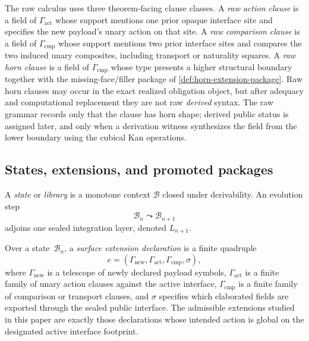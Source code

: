 \documentclass{lmcs}
\newcommand{\B}{\mathcal{B}}
\begin{document}
\begin{defi}
\label{def:raw-structural-clauses}
The raw calculus uses three theorem-facing clause classes. A \emph{raw action
clause} is a field of $\Gamma_{\mathrm{act}}$ whose support mentions one prior
opaque interface site and specifies the new payload's unary action on that site.
A \emph{raw comparison clause} is a field of $\Gamma_{\mathrm{cmp}}$ whose
support mentions two prior interface sites and compares the two induced unary
composites, including transport or naturality squares. A \emph{raw horn clause}
is a field of $\Gamma_{\mathrm{cmp}}$ whose type presents a higher structural
boundary together with the missing-face/filler package of
\autoref{def:horn-extension-package}. Raw horn clauses may occur in the exact
realized obligation object, but after adequacy and computational replacement
they are not raw \emph{derived} syntax. The raw grammar records only that the
clause has horn shape; derived public status is assigned later, and only when a
derivation witness synthesizes the field from the lower boundary using the
cubical Kan operations.
\end{defi}

\subsection{States, extensions, and promoted packages}

\begin{defi}[State]
\label{def:state}
A \emph{state} or \emph{library} is a monotone context $\B$ closed under derivability. An evolution step
\[
  \B_n \leadsto \B_{n+1}
\]
adjoins one sealed integration layer, denoted $L_{n+1}$.
\end{defi}

\begin{defi}
\label{def:surface-extension}
Over a state~$\B_n$, a \emph{surface extension declaration} is a finite quadruple
\[
  e = (\Gamma_{\mathrm{new}}, \Gamma_{\mathrm{act}}, \Gamma_{\mathrm{cmp}}, \sigma),
\]
where $\Gamma_{\mathrm{new}}$ is a telescope of newly declared payload symbols, $\Gamma_{\mathrm{act}}$ is a finite family of unary action clauses against the active interface, $\Gamma_{\mathrm{cmp}}$ is a finite family of comparison or transport clauses, and $\sigma$ specifies which elaborated fields are exported through the sealed public interface. The admissible extensions studied in this paper are exactly those declarations whose intended action is global on the designated active interface footprint.
\end{defi}
\end{document}
